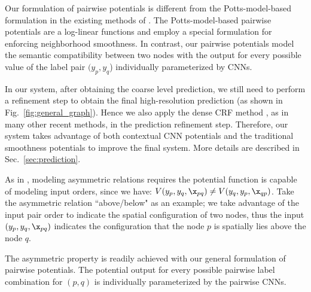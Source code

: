 %
%
%
%
%
%




Our formulation of pairwise potentials is different from the Potts-model-based formulation in the existing methods of \cite{ChenPKMY14,zheng2015conditional}.
The Potts-model-based pairwise potentials are a log-linear functions and
employ a special formulation for enforcing neighborhood smoothness.
In contrast, our pairwise potentials model the semantic compatibility between two nodes
 with the output for every possible value of the label pair $(y_{p}, y_{q}$) individually parameterized by CNNs. 


In our system, after obtaining the coarse level prediction, we still need to perform a refinement step to obtain the final high-resolution prediction 
(as shown in Fig.~\ref{fig:general_graph}).
Hence we also apply the dense CRF method \cite{krahenbuhl2012efficient}, as in many other recent methods, in the prediction refinement step.
Therefore, our system takes advantage of both contextual CNN potentials and the traditional smoothness potentials to improve the final system.
More details are described in Sec.~\ref{sec:prediction}.









As in \cite{winn2006layout,heesch2010markov},
modeling asymmetric relations requires the potential function is capable of modeling input orders, 
since we have: $ V  (y_{p}, y_{q},  \x_{pq}) \neq V (y_{q}, y_{p},  \x_{qp})$.
Take the asymmetric relation ``above/below" as an example;
we take advantage of the input pair order to indicate the spatial configuration of two nodes,
thus the input $(y_p, y_q, \x_{pq})$
indicates the configuration that the node $p$ is spatially lies above the node $q$.

The asymmetric property is readily achieved with our general formulation of pairwise potentials.  
The potential output for every possible pairwise label combination for $(p,q)$ is individually parameterized by the pairwise CNNs.  



























